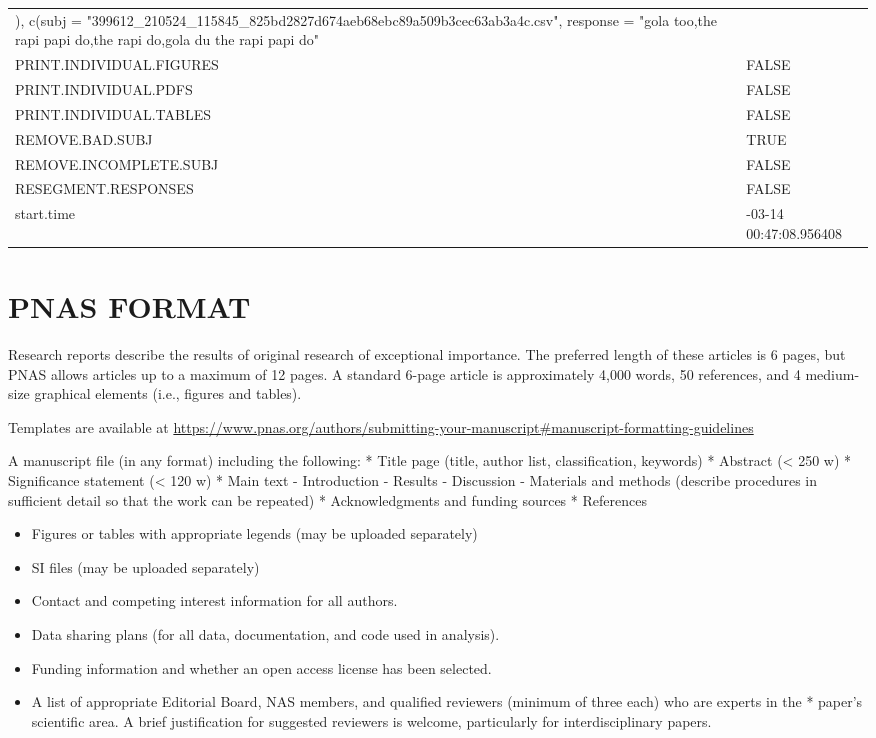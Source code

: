 \documentclass[
]{article}
\providecommand{\tightlist}{%
  \setlength{\itemsep}{0pt}\setlength{\parskip}{0pt}}
\begin{document}
\begin{longtable}[t]{>{\raggedright\arraybackslash}p{20em}>{\raggedright\arraybackslash}p{30em}}
), c(subj = "399612\_210524\_115845\_825bd2827d674aeb68ebc89a509b3cec63ab3a4c.csv", response = "gola too,the rapi papi do,the rapi do,gola du the rapi papi do"\\
\addlinespace
PRINT.INDIVIDUAL.FIGURES & FALSE\\
PRINT.INDIVIDUAL.PDFS & FALSE\\
PRINT.INDIVIDUAL.TABLES & FALSE\\
REMOVE.BAD.SUBJ & TRUE\\
REMOVE.INCOMPLETE.SUBJ & FALSE\\
\addlinespace
RESEGMENT.RESPONSES & FALSE\\
start.time & 2025-03-14 00:47:08.956408\\
\bottomrule
\end{longtable}

\clearpage

\section{PNAS FORMAT}\label{pnas-format}

Research reports describe the results of original research of
exceptional importance. The preferred length of these articles is 6
pages, but PNAS allows articles up to a maximum of 12 pages. A standard
6-page article is approximately 4,000 words, 50 references, and 4
medium-size graphical elements (i.e., figures and tables).

Templates are available at
\url{https://www.pnas.org/authors/submitting-your-manuscript\#manuscript-formatting-guidelines}

A manuscript file (in any format) including the following: * Title page
(title, author list, classification, keywords) * Abstract (\textless{}
250 w) * Significance statement (\textless{} 120 w) * Main text -
Introduction - Results - Discussion - Materials and methods (describe
procedures in sufficient detail so that the work can be repeated) *
Acknowledgments and funding sources * References

\begin{itemize}
\tightlist
\item
  Figures or tables with appropriate legends (may be uploaded
  separately)
\item
  SI files (may be uploaded separately)
\item
  Contact and competing interest information for all authors.
\item
  Data sharing plans (for all data, documentation, and code used in
  analysis).
\item
  Funding information and whether an open access license has been
  selected.
\item
  A list of appropriate Editorial Board, NAS members, and qualified
  reviewers (minimum of three each) who are experts in the * paper's
  scientific area. A brief justification for suggested reviewers is
  welcome, particularly for interdisciplinary papers.
\end{itemize}
\end{document}
